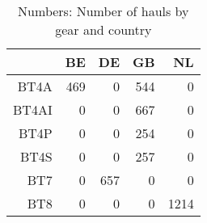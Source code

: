\begin{table}[ht]
\centering
\begin{tabular}{rrrrr}
  \hline
 & BE & DE & GB & NL \\ 
  \hline
BT4A & 469 & 0 & 544 & 0 \\ 
  BT4AI & 0 & 0 & 667 & 0 \\ 
  BT4P & 0 & 0 & 254 & 0 \\ 
  BT4S & 0 & 0 & 257 & 0 \\ 
  BT7 & 0 & 657 & 0 & 0 \\ 
  BT8 & 0 & 0 & 0 & 1214 \\ 
   \hline
\end{tabular}
\caption{Numbers: Number of hauls by gear and country} 
\end{table}
